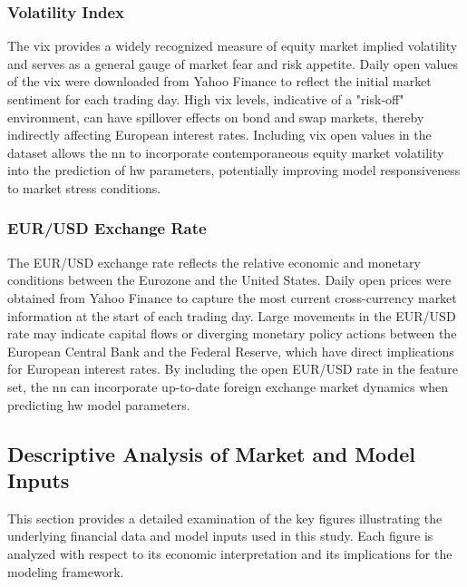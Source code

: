 \subsubsection{Volatility Index}
The \ac{vix} provides a widely recognized measure of equity market implied volatility and serves as a general gauge of market fear and risk appetite. Daily open values of the \ac{vix} were downloaded from Yahoo Finance to reflect the initial market sentiment for each trading day. High \ac{vix} levels, indicative of a "risk-off" environment, can have spillover effects on bond and swap markets, thereby indirectly affecting European interest rates. Including \ac{vix} open values in the dataset allows the \ac{nn} to incorporate contemporaneous equity market volatility into the prediction of \ac{hw} parameters, potentially improving model responsiveness to market stress conditions.

\subsubsection{EUR/USD Exchange Rate}
The EUR/USD exchange rate reflects the relative economic and monetary conditions between the Eurozone and the United States. Daily open prices were obtained from Yahoo Finance to capture the most current cross-currency market information at the start of each trading day. Large movements in the EUR/USD rate may indicate capital flows or diverging monetary policy actions between the European Central Bank and the Federal Reserve, which have direct implications for European interest rates. By including the open EUR/USD rate in the feature set, the \ac{nn} can incorporate up-to-date foreign exchange market dynamics when predicting \ac{hw} model parameters.

\subsection{Descriptive Analysis of Market and Model Inputs}
This section provides a detailed examination of the key figures illustrating the underlying financial data and model inputs used in this study. Each figure is analyzed with respect to its economic interpretation and its implications for the modeling framework.

